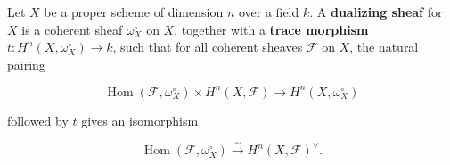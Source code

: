 Let $X$ be a proper scheme of dimension $n$ over a field $k$. A \textbf{dualizing sheaf} for $X$ is a coherent sheaf $\omega_X^\circ$ on $X$, together with a \textbf{trace morphism} $t: H^n(X, \omega_X^\circ) \to k$, such that for all coherent sheaves $\mathcal{F}$ on $X$, the natural pairing

$$\operatorname{Hom}(\mathcal{F}, \omega_X^\circ) \times H^n(X, \mathcal{F}) \to H^n(X, \omega_X^\circ)$$

followed by $t$ gives an isomorphism

$$\operatorname{Hom}(\mathcal{F}, \omega_X^\circ) \xrightarrow{\sim} H^n(X, \mathcal{F})^\vee.$$
